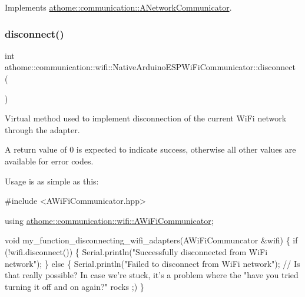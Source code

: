 Implements \mbox{\hyperlink{classathome_1_1communication_1_1_a_network_communicator_a370176dae8f38225446e83a132dbcff7}{athome\+::communication\+::\+A\+Network\+Communicator}}.

\mbox{\label{classathome_1_1communication_1_1wifi_1_1_native_arduino_e_s_p_wi_fi_communicator_a3787e850d48d149ee1392ebfb2920bb3}} 
\subsubsection{\texorpdfstring{disconnect()}{disconnect()}}
{\footnotesize\ttfamily int athome\+::communication\+::wifi\+::\+Native\+Arduino\+E\+S\+P\+Wi\+Fi\+Communicator\+::disconnect (\begin{DoxyParamCaption}{ }\end{DoxyParamCaption})\hspace{0.3cm}{\ttfamily [virtual]}}

Virtual method used to implement disconnection of the current Wi\+Fi network through the adapter.

A return value of 0 is expected to indicate success, otherwise all other values are available for error codes.

Usage is as simple as this\+:


\begin{DoxyCode}
\textcolor{preprocessor}{#include <AWiFiCommunicator.hpp>}

\textcolor{keyword}{using} \mbox{\hyperlink{classathome_1_1communication_1_1wifi_1_1_a_wi_fi_communicator}{athome::communication::wifi::AWiFiCommunicator}};

\textcolor{keywordtype}{void} my\_function\_disconnecting\_wifi\_adapters(AWiFiCommuncator &wifi) \{
  \textcolor{keywordflow}{if} (!wifi.disconnect()) \{
    Serial.println(\textcolor{stringliteral}{"Successfully disconnected from WiFi network"});
  \} \textcolor{keywordflow}{else} \{
    Serial.println(\textcolor{stringliteral}{"Failed to disconnect from WiFi network"}); \textcolor{comment}{// Is that really possible? In case we're
       stuck, it's a problem where the "have you tried turning it off and on again?" rocks ;)}
\}
\end{DoxyCode}
 

